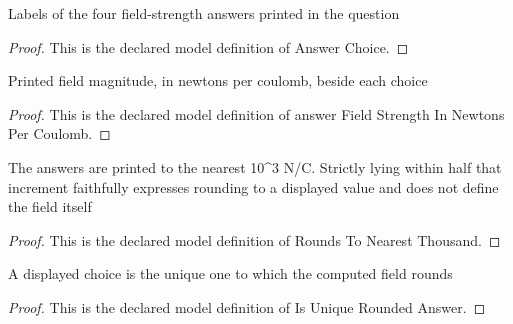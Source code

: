 \begin{definition}
  \label{def:physics:phyx-mini-0835:phyxminiproblems-problemphyxmini0835-answerchoice}
  Labels of the four field-strength answers printed in the question
\end{definition}
\begin{proof}
  This is the declared model definition of Answer Choice.
\end{proof}
\begin{definition}
  \label{def:physics:phyx-mini-0835:phyxminiproblems-problemphyxmini0835-answerfieldstrengthinnewtonspercoulomb}
  Printed field magnitude, in newtons per coulomb, beside each choice
\end{definition}
\begin{proof}
  This is the declared model definition of answer Field Strength In Newtons Per Coulomb.
\end{proof}
\begin{definition}
  \label{def:physics:phyx-mini-0835:phyxminiproblems-problemphyxmini0835-roundstonearestthousand}
  The answers are printed to the nearest 10\textasciicircum{}3 N/C. Strictly lying within half that increment faithfully expresses rounding to a displayed value and does not define the field itself
\end{definition}
\begin{proof}
  This is the declared model definition of Rounds To Nearest Thousand.
\end{proof}
\begin{definition}
  \label{def:physics:phyx-mini-0835:phyxminiproblems-problemphyxmini0835-isuniqueroundedanswer}
  A displayed choice is the unique one to which the computed field rounds
\end{definition}
\begin{proof}
  This is the declared model definition of Is Unique Rounded Answer.
\end{proof}
